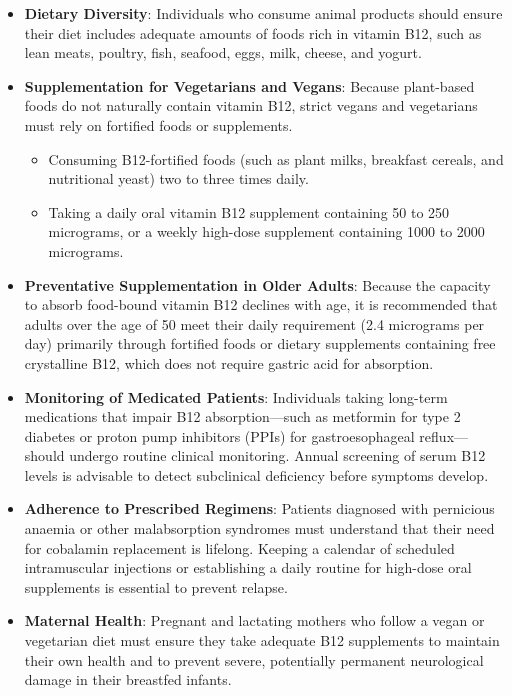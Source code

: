 \begin{itemize}
    \item \textbf{Dietary Diversity}: Individuals who consume animal products should ensure their diet includes adequate amounts of foods rich in vitamin B12, such as lean meats, poultry, fish, seafood, eggs, milk, cheese, and yogurt.
    \item \textbf{Supplementation for Vegetarians and Vegans}: Because plant-based foods do not naturally contain vitamin B12, strict vegans and vegetarians must rely on fortified foods or supplements.
    \begin{itemize}
        \item Consuming B12-fortified foods (such as plant milks, breakfast cereals, and nutritional yeast) two to three times daily.
        \item Taking a daily oral vitamin B12 supplement containing 50 to 250 micrograms, or a weekly high-dose supplement containing 1000 to 2000 micrograms.
    \end{itemize}
    \item \textbf{Preventative Supplementation in Older Adults}: Because the capacity to absorb food-bound vitamin B12 declines with age, it is recommended that adults over the age of 50 meet their daily requirement (2.4 micrograms per day) primarily through fortified foods or dietary supplements containing free crystalline B12, which does not require gastric acid for absorption.
    \item \textbf{Monitoring of Medicated Patients}: Individuals taking long-term medications that impair B12 absorption—such as metformin for type 2 diabetes or proton pump inhibitors (PPIs) for gastroesophageal reflux—should undergo routine clinical monitoring. Annual screening of serum B12 levels is advisable to detect subclinical deficiency before symptoms develop.
    \item \textbf{Adherence to Prescribed Regimens}: Patients diagnosed with pernicious anaemia or other malabsorption syndromes must understand that their need for cobalamin replacement is lifelong. Keeping a calendar of scheduled intramuscular injections or establishing a daily routine for high-dose oral supplements is essential to prevent relapse.
    \item \textbf{Maternal Health}: Pregnant and lactating mothers who follow a vegan or vegetarian diet must ensure they take adequate B12 supplements to maintain their own health and to prevent severe, potentially permanent neurological damage in their breastfed infants.
\end{itemize}

